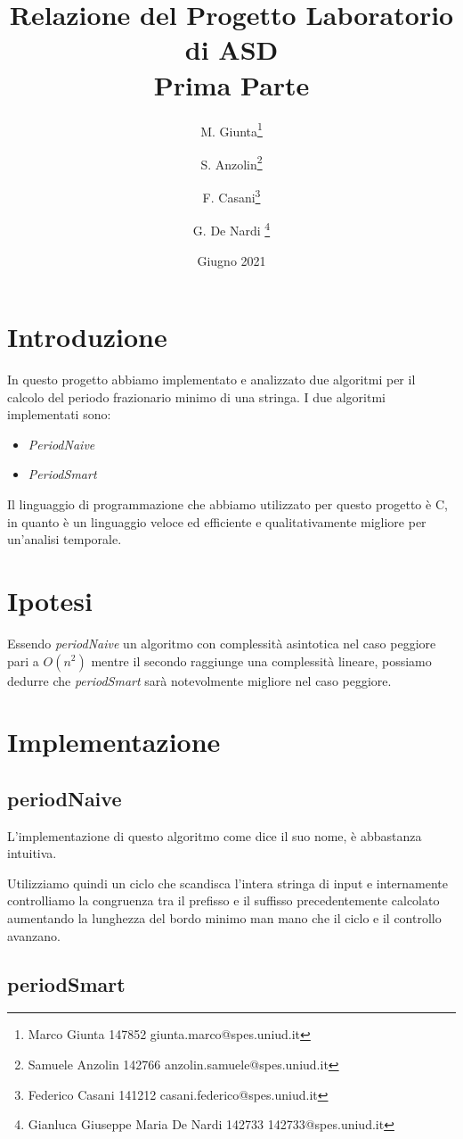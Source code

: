 \documentclass[a4paper,titlepage]{article}
\title{Relazione del Progetto Laboratorio di ASD\\[0.5em]
\large Prima Parte}
\date{Giugno 2021}
\author{
M. Giunta\thanks{Marco Giunta 147852 giunta.marco@spes.uniud.it} \and
S. Anzolin\thanks{Samuele Anzolin 142766  anzolin.samuele@spes.uniud.it} \and
F. Casani\thanks{Federico Casani 141212  casani.federico@spes.uniud.it} \and
G. De Nardi \thanks{Gianluca Giuseppe Maria De Nardi 142733 142733@spes.uniud.it}
}
\begin{document}
\maketitle

\tableofcontents
\newpage

\section{Introduzione}
In questo progetto abbiamo implementato e analizzato due algoritmi per il calcolo del periodo frazionario minimo di una stringa.
I due algoritmi implementati sono:
\begin{itemize}
  \item \textit{PeriodNaive}
  \item \textit{PeriodSmart}
\end{itemize}
Il linguaggio di programmazione che abbiamo utilizzato per questo progetto è C, in quanto è un linguaggio veloce ed efficiente e qualitativamente migliore per un’analisi temporale.

\section{Ipotesi}
Essendo \textit{periodNaive} un algoritmo con complessità asintotica nel caso peggiore pari a \(O(n^2)\) mentre il secondo raggiunge una complessità lineare, possiamo dedurre
che \textit{periodSmart} sarà notevolmente migliore nel caso peggiore.
\newpage

\section{Implementazione}

\subsection{periodNaive}

L’implementazione di questo algoritmo come dice il suo nome, è abbastanza intuitiva.

Utilizziamo quindi un ciclo che scandisca l’intera stringa di input e internamente controlliamo la congruenza tra il prefisso e il suffisso precedentemente calcolato aumentando la lunghezza del bordo minimo man mano che il ciclo e il controllo avanzano.

\subsection{periodSmart}
\end{document}
